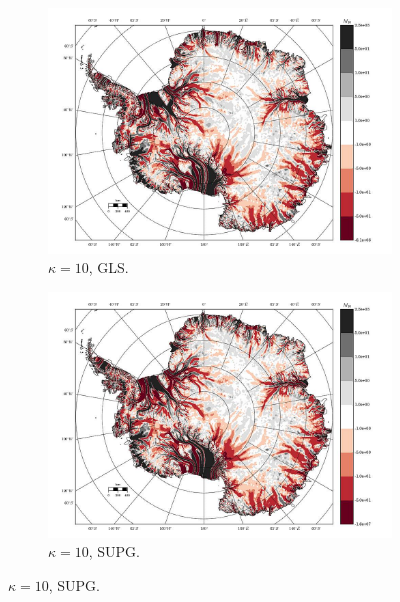 \begin{figure}
  \begin{subfigure}[b]{0.45\linewidth}
    \includegraphics[width=\linewidth]{images/balance_velocity/antarctica/d_gS_m_U/misfit_10H_kappa_10_GLS.jpg}
  \caption{$\kappa = 10$, GLS.}
  \label{antarctica_bv_image_kappa_5_GLS_gS_m_U_misfit}
  \end{subfigure}
  \begin{subfigure}[b]{0.45\linewidth}
    \includegraphics[width=\linewidth]{images/balance_velocity/antarctica/d_gS_m_U/misfit_10H_kappa_10_SUPG.jpg}
  \caption{$\kappa = 10$, SUPG.}
  \label{antarctica_bv_image_kappa_5_SUPG_gS_m_U_misfit}
  \end{subfigure}
  

\end{figure}
